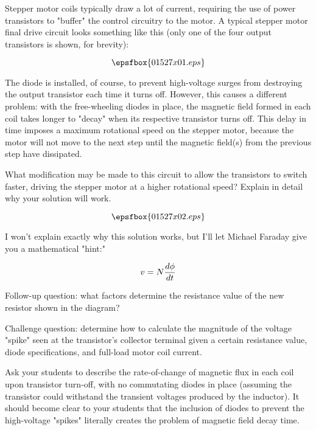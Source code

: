 

Stepper motor coils typically draw a lot of current, requiring the use of power transistors to "buffer" the control circuitry to the motor.  A typical stepper motor final drive circuit looks something like this (only one of the four output transistors is shown, for brevity):

$$\epsfbox{01527x01.eps}$$

The diode is installed, of course, to prevent high-voltage surges from destroying the output transistor each time it turns off.  However, this causes a different problem: with the free-wheeling diodes in place, the magnetic field formed in each coil takes longer to "decay" when its respective transistor turns off.  This delay in time imposes a maximum rotational speed on the stepper motor, because the motor will not move to the next step until the magnetic field(s) from the previous step have dissipated.

What modification may be made to this circuit to allow the transistors to switch faster, driving the stepper motor at a higher rotational speed?  Explain in detail why your solution will work.







$$\epsfbox{01527x02.eps}$$

I won't explain exactly why this solution works, but I'll let Michael Faraday give you a mathematical "hint:"

$$v = N {d \phi \over dt}$$

\vskip 10pt

Follow-up question: what factors determine the resistance value of the new resistor shown in the diagram? 

\vskip 10pt

Challenge question: determine how to calculate the magnitude of the voltage "spike" seen at the transistor's collector terminal given a certain resistance value, diode specifications, and full-load motor coil current.







Ask your students to describe the rate-of-change of magnetic flux in each coil upon transistor turn-off, with no commutating diodes in place (assuming the transistor could withstand the transient voltages produced by the inductor).  It should become clear to your students that the inclusion of diodes to prevent the high-voltage "spikes" literally creates the problem of magnetic field decay time.




